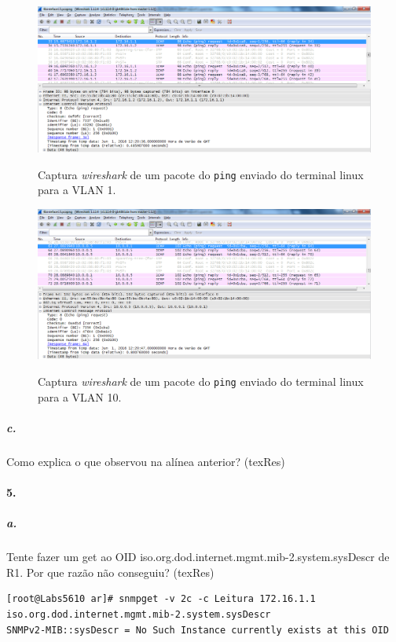 \begin{figure}[h]
\centering
\includegraphics[width=1\textwidth, height=0.33\textheight]{ping_VLAN1.png}
\label{fig:2-capturaWireshark}
\caption{Captura \emph{wireshark} de um pacote do \texttt{ping} enviado do terminal \textsf{linux} para a \textsf{VLAN 1}.}
\end{figure}

\begin{figure}[h]
\centering
\includegraphics[width=1\textwidth, height=0.33\textheight]{ping_VLAN10.png}
\label{fig:2-capturaWireshark}
\caption{Captura \emph{wireshark} de um pacote do \texttt{ping} enviado do terminal \textsf{linux} para a \textsf{VLAN 10}.}
\end{figure}


\subparagraph{c.}
Como explica o que observou na alínea anterior? (texRes)


\paragraph{5.}

\subparagraph{a.}
Tente fazer um get ao OID iso.org.dod.internet.mgmt.mib-2.system.sysDescr de R1. Por que razão não conseguiu? (texRes)

\begin{verbatim}
[root@Labs5610 ar]# snmpget -v 2c -c Leitura 172.16.1.1 iso.org.dod.internet.mgmt.mib-2.system.sysDescr
SNMPv2-MIB::sysDescr = No Such Instance currently exists at this OID
\end{verbatim}

